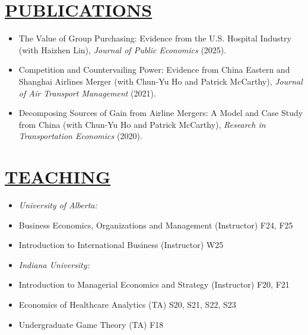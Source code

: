 \documentclass{res}
\begin{document}
\begin{resume}
\section{\large{\ul{PUBLICATIONS}}}
\vspace{1.8em}
\begin{itemize}[leftmargin=!,labelindent=-15pt,itemindent=-15pt,itemsep=0.1em]
    \item[] The Value of Group Purchasing: Evidence from the U.S. Hospital Industry (with Haizhen Lin), \textit{Journal of Public Economics} (2025).
    \item[] Competition and Countervailing Power: Evidence from China Eastern and Shanghai Airlines Merger (with Chun-Yu Ho and Patrick McCarthy), \textit{Journal of Air Transport Management} (2021).
    \item[] Decomposing Sources of Gain from Airline Mergers: A Model and Case Study from China (with Chun-Yu Ho and Patrick McCarthy), \textit{Research in Transportation Economics} (2020).
\end{itemize}

\section{\large{\ul{TEACHING}}}
\vspace{1.8em}
\begin{itemize}[leftmargin=!,labelindent=-15pt,itemindent=-15pt,itemsep=0.1em]
\item[] \textit{University of Alberta:}
    \item[] \hspace{15pt} Business Economics, Organizations and Management  (Instructor) \hfill F24, F25
    \item[] \hspace{15pt} Introduction to International Business (Instructor) \hfill W25
\item[] \textit{Indiana University:}
    \item[] \hspace{15pt} Introduction to Managerial Economics and Strategy (Instructor) \hfill F20, F21
    \item[] \hspace{15pt} Economics of Healthcare Analytics (TA) \hfill S20, S21, S22, S23
    \item[] \hspace{15pt} Undergraduate Game Theory (TA) \hfill F18
\end{itemize}


\end{resume}
\end{document}
